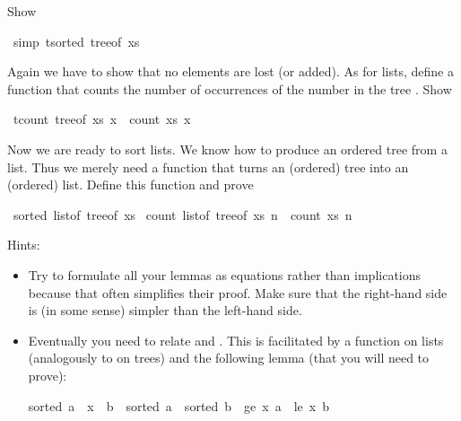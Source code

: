 \begin{isabellebody}
\begin{isamarkuptext}
Show%
\end{isamarkuptext}%
\isamarkuptrue%
\ {\isacharbrackleft}simp{\isacharbrackright}{\isacharcolon}\ {\isachardoublequote}tsorted\ {\isacharparenleft}tree{\isacharunderscore}of\ xs{\isacharparenright}{\isachardoublequote}\isamarkupfalse%
\isamarkupfalse%
%
\begin{isamarkuptext}%
Again we have to show that no elements are lost (or added).
As for lists, define a function  that counts the
number of occurrences of the number  in the tree .
Show%
\end{isamarkuptext}%
\isamarkuptrue%
\ {\isachardoublequote}tcount\ {\isacharparenleft}tree{\isacharunderscore}of\ xs{\isacharparenright}\ x\ {\isacharequal}\ count\ xs\ x{\isachardoublequote}\isamarkupfalse%
\isamarkupfalse%
%
\begin{isamarkuptext}%
Now we are ready to sort lists. We know how to produce an
ordered tree from a list. Thus we merely need a function  that turns an (ordered) tree into an (ordered) list.
Define this function and prove%
\end{isamarkuptext}%
\isamarkuptrue%
\ {\isachardoublequote}sorted\ {\isacharparenleft}list{\isacharunderscore}of\ {\isacharparenleft}tree{\isacharunderscore}of\ xs{\isacharparenright}{\isacharparenright}{\isachardoublequote}\isamarkupfalse%
\isanewline
\isamarkupfalse%
\ {\isachardoublequote}count\ {\isacharparenleft}list{\isacharunderscore}of\ {\isacharparenleft}tree{\isacharunderscore}of\ xs{\isacharparenright}{\isacharparenright}\ n\ {\isacharequal}\ count\ xs\ n{\isachardoublequote}\ \ \ \ \isanewline
\isamarkupfalse%
\isamarkupfalse%
%
\begin{isamarkuptext}%
Hints:
\begin{itemize}
\item
Try to formulate all your lemmas as equations rather than implications
because that often simplifies their proof.
Make sure that the right-hand side is (in some sense)
simpler than the left-hand side.
\item
Eventually you need to relate  and .
This is facilitated by a function  on lists (analogously to
 on trees) and the following lemma (that you will need to prove):
\begin{isabelle}%
sorted\ {\isacharparenleft}a\ {\isacharat}\ x\ {\isacharhash}\ b{\isacharparenright}\ {\isacharequal}\ {\isacharparenleft}sorted\ a\ {\isasymand}\ sorted\ b\ {\isasymand}\ ge\ x\ a\ {\isasymand}\ le\ x\ b{\isacharparenright}%
\end{isabelle}
\end{itemize}%
\end{isamarkuptext}%
\isamarkuptrue%
\isamarkupfalse%
\end{isabellebody}%
